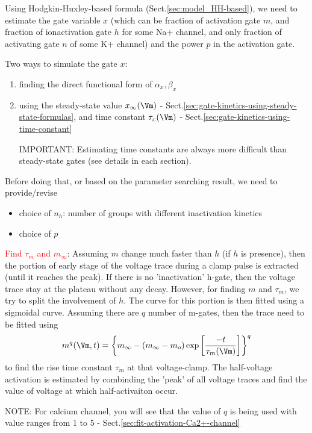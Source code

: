 Using Hodgkin-Huxley-based formula (Sect.\ref{sec:model_HH-based}), we need to
estimate the gate variable $x$ (which can be fraction of activation gate
$m$, and fraction of ionactivation gate $h$ for some Na+ channel, and only
fraction of activating gate $n$ of some K+ channel) and the power $p$ in the
activation gate.

Two ways to simulate the gate $x$:
\begin{enumerate}
  \item finding the direct functional form of $\alpha_x, \beta_x$

  \item using the steady-state value $x_\infty(\Vm)$ -
  Sect.\ref{sec:gate-kinetics-using-steady-state-formulas},
  and time constant $\tau_x(\Vm)$ -
  Sect.\ref{sec:gate-kinetics-using-time-constant}

IMPORTANT: Estimating time constants are always more difficult than steady-state
gates (see details in each section).
\end{enumerate}

Before doing that, or based on the parameter searching result, we need to
provide/revise
\begin{itemize}
  \item choice of $n_h$: number of groups with different inactivation kinetics

  \item choice of $p$
\end{itemize}

\textcolor{red}{Find $\tau_m$ and $m_\infty$}:
Assuming $m$ change much faster than $h$ (if $h$ is presence), then the portion
of early stage of the voltage trace during a clamp pulse is extracted (until it
reaches the peak). If there is no 'inactivation' h-gate, then the voltage trace
stay at the plateau without any decay. However, for finding $m$ and $\tau_m$, we
try to split the involvement of $h$. The curve for this portion is then fitted
using a sigmoidal curve. Assuming there are $q$ number of m-gates, then the
trace need to be fitted using
\begin{equation}
m^q(\Vm, t) = \left\{m_\infty - (m_\infty - m_o) \exp \left[
\frac{-t}{\tau_m(\Vm)} \right] \right\}^q 
\end{equation}
to find the rise time constant $\tau_m$ at that voltage-clamp. The half-voltage
activation is estimated by combinding the 'peak' of all voltage traces and find the value of voltage at
which half-activaiton occur. 

NOTE: For calcium channel, you will see that the value of $q$ is being used with
value ranges from 1 to 5 - Sect.\ref{sec:fit-activation-Ca2+-channel}

